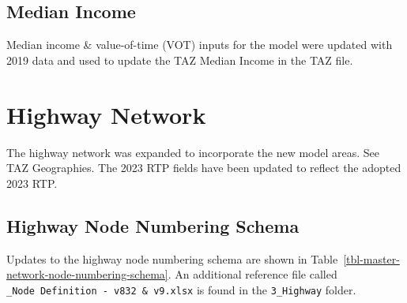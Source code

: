 \documentclass[
  letterpaper,
  DIV=11,
  numbers=noendperiod,
  titlepage=false]{scrreprt}
\begin{document}
\hypertarget{median-income}{%
\subsection{Median Income}\label{median-income}}

Median income \& value-of-time (VOT) inputs for the model were updated
with 2019 data and used to update the TAZ Median Income in the TAZ file.

\hypertarget{highway-network}{%
\section{Highway Network}\label{highway-network}}

The highway network was expanded to incorporate the new model areas. See
TAZ Geographies. The 2023 RTP fields have been updated to reflect the
adopted 2023 RTP.

\hypertarget{highway-node-numbering-schema}{%
\subsection{Highway Node Numbering
Schema}\label{highway-node-numbering-schema}}

Updates to the highway node numbering schema are shown in
Table~\ref{tbl-master-network-node-numbering-schema}. An additional
reference file called \texttt{\_Node\ Definition\ -\ v832\ \&\ v9.xlsx}
is found in the \texttt{3\_Highway} folder.
\end{document}
